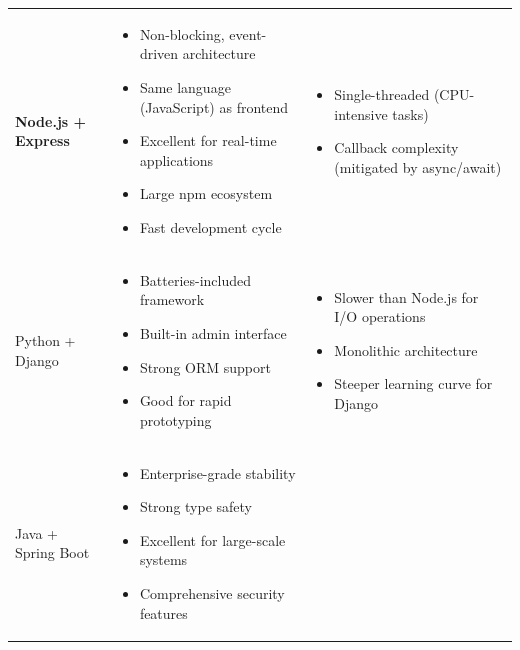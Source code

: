 \documentclass[a4paper]{article}
\begin{document}
\begin{longtable}{@{}
    >{\raggedright\arraybackslash}p{}
    >{\raggedright\arraybackslash}p{}
    >{\raggedright\arraybackslash}p{} @{}}
    \textbf{Node.js + Express} & 
    \begin{itemize}[leftmargin=*, nosep, topsep=0pt]
        \item Non-blocking, event-driven architecture
        \item Same language (JavaScript) as frontend
        \item Excellent for real-time applications
        \item Large npm ecosystem
        \item Fast development cycle
    \end{itemize} & 
    \begin{itemize}[leftmargin=*, nosep, topsep=0pt]
        \item Single-threaded (CPU-intensive tasks)
        \item Callback complexity (mitigated by async/await)
    \end{itemize} \\
    \addlinespace
    \midrule
    \addlinespace
    Python + Django & 
    \begin{itemize}[leftmargin=*, nosep, topsep=0pt]
        \item Batteries-included framework
        \item Built-in admin interface
        \item Strong ORM support
        \item Good for rapid prototyping
    \end{itemize} & 
    \begin{itemize}[leftmargin=*, nosep, topsep=0pt]
        \item Slower than Node.js for I/O operations
        \item Monolithic architecture
        \item Steeper learning curve for Django
    \end{itemize} \\
    \addlinespace
    \midrule
    \addlinespace
    Java + Spring Boot & 
    \begin{itemize}[leftmargin=*, nosep, topsep=0pt]
        \item Enterprise-grade stability
        \item Strong type safety
        \item Excellent for large-scale systems
        \item Comprehensive security features
    \end{itemize} & 
    \begin{itemize}[leftmargin=*, nosep, topsep=0pt]

\end{itemize}
\end{longtable}
\end{document}
